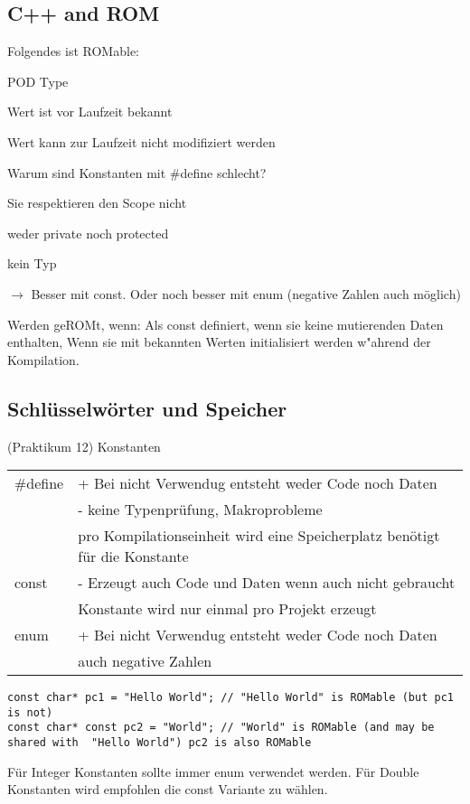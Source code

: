 \subsection{C++ and ROM}
Folgendes ist ROMable: 
\begin{compactitem}


\item POD Type
\item Wert ist vor Laufzeit bekannt
\item Wert kann zur Laufzeit nicht modifiziert werden
\item Warum sind Konstanten mit \#define schlecht?
	\begin{compactitem}
		\item Sie respektieren den Scope nicht
		\item weder private noch protected
		\item kein Typ
	\end{compactitem}
	$\rightarrow$ Besser mit const. Oder noch besser mit enum (negative Zahlen auch möglich) 
\item Werden geROMt, wenn: Als const definiert, wenn sie keine mutierenden
	Daten enthalten, Wenn sie mit bekannten Werten initialisiert werden
	w"ahrend der Kompilation.
\end{compactitem}

\subsection{Schlüsselwörter und Speicher}  (Praktikum 12)
Konstanten\\
\begin{tabular}{l|l}
\hline
   \#define  & + Bei nicht Verwendug entsteht weder Code noch Daten\\
             & - keine Typenprüfung, Makroprobleme\\ 
             & pro Kompilationseinheit wird eine Speicherplatz benötigt für die Konstante \\ \hline
    const    & - Erzeugt auch Code und Daten wenn auch nicht gebraucht\\ 
             & Konstante wird nur einmal pro Projekt erzeugt\\\hline
    enum     & + Bei nicht Verwendug entsteht weder Code noch Daten\\
             & auch negative Zahlen\\\hline
\end{tabular}

\begin{lstlisting}
const char* pc1 = "Hello World"; // "Hello World" is ROMable (but pc1 is not)
const char* const pc2 = "World"; // "World" is ROMable (and may be shared with  "Hello World") pc2 is also ROMable
\end{lstlisting}
Für Integer Konstanten sollte immer enum verwendet werden. Für Double Konstanten wird empfohlen die const Variante zu wählen.\\

